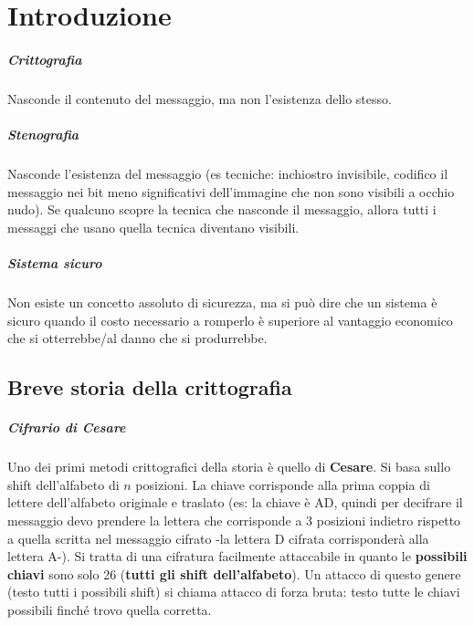 \setchapterpreamble[u]{\margintoc}
\chapter{Introduzione}

\paragraph*{Crittografia} Nasconde il contenuto del messaggio, ma non l'esistenza dello stesso.

\paragraph*{Stenografia} Nasconde l'esistenza del messaggio (es tecniche: inchiostro invisibile, codifico il messaggio nei bit meno significativi dell'immagine che non sono visibili a occhio nudo). Se qualcuno scopre la tecnica che nasconde il messaggio, allora tutti i messaggi che usano quella tecnica diventano visibili.

\paragraph*{Sistema sicuro} Non esiste un concetto assoluto di sicurezza, ma si può dire che un sistema è sicuro quando il costo necessario a romperlo è superiore al vantaggio economico che si otterrebbe/al danno che si produrrebbe.

\section{Breve storia della crittografia}

\paragraph*{Cifrario di Cesare} Uno dei primi metodi crittografici della storia è quello di \textbf{Cesare}. Si basa sullo shift dell'alfabeto di $n$ posizioni. La chiave corrisponde alla prima coppia di lettere dell'alfabeto originale e traslato (es: la chiave è AD, quindi per decifrare il messaggio devo prendere la lettera che corrisponde a 3 posizioni indietro rispetto a quella scritta nel messaggio cifrato -la lettera D cifrata corrisponderà alla lettera A-).
Si tratta di una cifratura facilmente attaccabile in quanto le \textbf{possibili chiavi} sono solo 26 (\textbf{tutti gli shift dell'alfabeto}).
Un attacco di questo genere (testo tutti i possibili shift) si chiama attacco di forza bruta: testo tutte le chiavi possibili finché trovo quella corretta.

